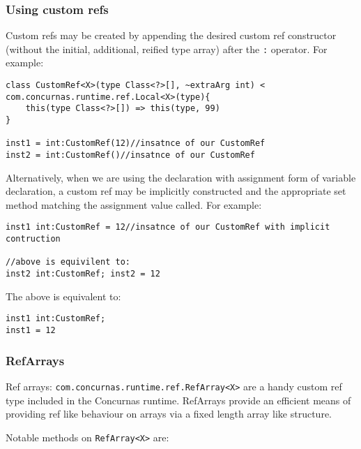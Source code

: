 \documentclass[conc-doc]{subfiles}
\begin{document}
\subsubsection{Using custom refs}
Custom refs may be created by appending the desired custom ref constructor (without the initial, additional, reified type array) after the \lstinline{:} operator. For example:

\begin{lstlisting}
class CustomRef<X>(type Class<?>[], ~extraArg int) < com.concurnas.runtime.ref.Local<X>(type){
	this(type Class<?>[]) => this(type, 99)
}

inst1 = int:CustomRef(12)//insatnce of our CustomRef
inst2 = int:CustomRef()//insatnce of our CustomRef
\end{lstlisting}

Alternatively, when we are using the declaration with assignment form of variable declaration, a custom ref may be implicitly constructed and the appropriate set method matching the assignment value called. For example:

\begin{lstlisting}
inst1 int:CustomRef = 12//insatnce of our CustomRef with implicit contruction

//above is equivilent to:
inst2 int:CustomRef; inst2 = 12
\end{lstlisting}

The above is equivalent to:

\begin{lstlisting}
inst1 int:CustomRef; 
inst1 = 12
\end{lstlisting}

\subsubsection{RefArrays}
Ref arrays: \lstinline{com.concurnas.runtime.ref.RefArray<X>} are a handy custom ref type included in the Concurnas runtime. RefArrays provide an efficient means of providing ref like behaviour on arrays via a fixed length array like structure.

Notable methods on \lstinline{RefArray<X>} are:
\end{document}
